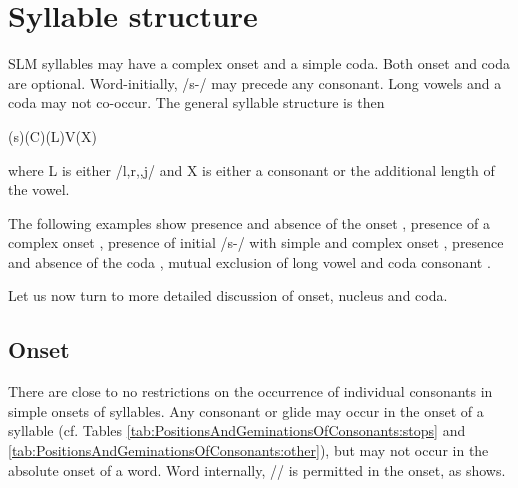 \section{Syllable structure}\label{sec:phon:Syllablestructure}
SLM syllables may have a complex onset and a simple coda. Both onset and coda are optional.  Word-initially,  /s-/ may precede any consonant. Long vowels and a coda may not co-occur. The general syllable structure is then

\ea (s)(C)(L)V(X)\z

where L is either /l,r,\V,j/ and X is either a consonant or the additional length of the vowel.

The following examples show
presence and absence of the onset ,
presence of a complex onset ,
presence of initial /s-/ with simple and complex onset ,
presence and absence of the coda ,
mutual exclusion of long vowel and coda consonant .





Let us now turn to more detailed discussion of onset, nucleus and coda.

\subsection{Onset}\label{sec:phon:Onset}
There are close to no restrictions on the occurrence of individual consonants in simple onsets of syllables. Any consonant or glide may occur in the onset of a syllable (cf. Tables \ref{tab:PositionsAndGeminationsOfConsonants:stops} and \ref{tab:PositionsAndGeminationsOfConsonants:other}), but  may not occur in the absolute onset of a word.
Word internally, /\ng/ is permitted in the onset, as  shows.

